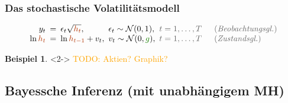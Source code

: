 \documentclass[10pt]{beamer}
\theoremstyle{definition}
\newtheorem*{bsp}{Beispiel}
\newcommand{\Normal}{\mathcal{N}} %
\newcommand{\TODO}[1]{\textcolor{orange}{TODO: #1}}
\newcommand{\stepOne}[1]{\textcolor{StepOneColor}{#1}}
\newcommand{\stepTwo}[1]{\textcolor{StepTwoColor}{#1}}
\newcommand{\typeInfo}[1]{\textcolor{TypeInfoColor}{#1}}
\begin{document}
\begin{frame}[t]
  \frametitle{Das stochastische Volatilitätsmodell}
  \begin{modelbox}
    \[
      \arraycolsep=2.5pt
      \begin{array}{rcllll}
        y_t &=& \epsilon_t \sqrt{\stepOne{h_t}}, & \epsilon_t \sim \Normal(0, 1), & \typeInfo{t = 1, \ldots, T} \quad & \text{\typeInfo{(\emph{Beobachtungsgl.})}} \\
        \ln \stepOne{h_t} &=& \ln \stepOne{h_{t-1}} + v_t, & v_t \sim \Normal(0, \stepTwo{g}), & \typeInfo{t = 1, \ldots, T} \quad & \text{\typeInfo{(\emph{Zustandsgl.})}}
      \end{array}
    \]
  \end{modelbox}

  \begin{bsp}<2->
    \TODO{Aktien? Graphik?}
  \end{bsp}
\end{frame}

\subsection{Bayessche Inferenz (mit unabhängigem MH)}
\end{document}
